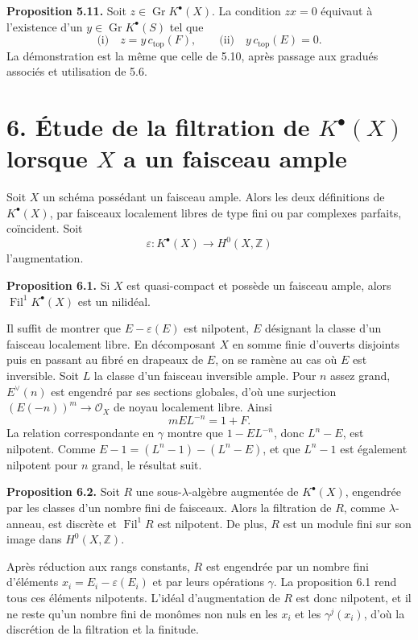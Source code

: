 \documentclass[11pt]{article}
\newcommand{\Gr}{\operatorname{Gr}}
\newcommand{\Fil}{\operatorname{Fil}}
\providecommand{\Gr}{\operatorname{Gr}}
\providecommand{\Gr}{\operatorname{G}}
\begin{document}
\textbf{Proposition 5.11.} Soit \(z\in\Gr K^\bullet(X)\). La condition \(zx=0\) équivaut à l'existence d'un \(y\in\Gr K^\bullet(S)\) tel que
\[
  \text{(i)}\quad z=y\,c_{\mathrm{top}}(F),
  \qquad
  \text{(ii)}\quad y\,c_{\mathrm{top}}(E)=0.
\]
La démonstration est la même que celle de 5.10, après passage aux gradués associés et utilisation de 5.6.

\section*{6. Étude de la filtration de \(K^\bullet(X)\) lorsque \(X\) a un faisceau ample}

Soit \(X\) un schéma possédant un faisceau ample. Alors les deux définitions de \(K^\bullet(X)\), par faisceaux localement libres de type fini ou par complexes parfaits, coïncident. Soit
\[
  \varepsilon:K^\bullet(X)\longrightarrow H^0(X,\mathbb Z)
\]
l'augmentation.

\textbf{Proposition 6.1.} Si \(X\) est quasi-compact et possède un faisceau ample, alors \(\Fil^1K^\bullet(X)\) est un nilidéal.

Il suffit de montrer que \(E-\varepsilon(E)\) est nilpotent, \(E\) désignant la classe d'un faisceau localement libre. En décomposant \(X\) en somme finie d'ouverts disjoints puis en passant au fibré en drapeaux de \(E\), on se ramène au cas où \(E\) est inversible. Soit \(L\) la classe d'un faisceau inversible ample. Pour \(n\) assez grand, \(E^\vee(n)\) est engendré par ses sections globales, d'où une surjection \((E(-n))^m\to\mathcal O_X\) de noyau localement libre. Ainsi
\[
  mEL^{-n}=1+F.
\]
La relation correspondante en \(\gamma\) montre que \(1-EL^{-n}\), donc \(L^n-E\), est nilpotent. Comme \(E-1=(L^n-1)-(L^n-E)\), et que \(L^n-1\) est également nilpotent pour \(n\) grand, le résultat suit.

\textbf{Proposition 6.2.} Soit \(R\) une sous-\(\lambda\)-algèbre augmentée de \(K^\bullet(X)\), engendrée par les classes d'un nombre fini de faisceaux. Alors la filtration de \(R\), comme \(\lambda\)-anneau, est discrète et \(\Fil^1R\) est nilpotent. De plus, \(R\) est un module fini sur son image dans \(H^0(X,\mathbb Z)\).

Après réduction aux rangs constants, \(R\) est engendrée par un nombre fini d'éléments \(x_i=E_i-\varepsilon(E_i)\) et par leurs opérations \(\gamma\). La proposition 6.1 rend tous ces éléments nilpotents. L'idéal d'augmentation de \(R\) est donc nilpotent, et il ne reste qu'un nombre fini de monômes non nuls en les \(x_i\) et les \(\gamma^j(x_i)\), d'où la discrétion de la filtration et la finitude.
\end{document}
